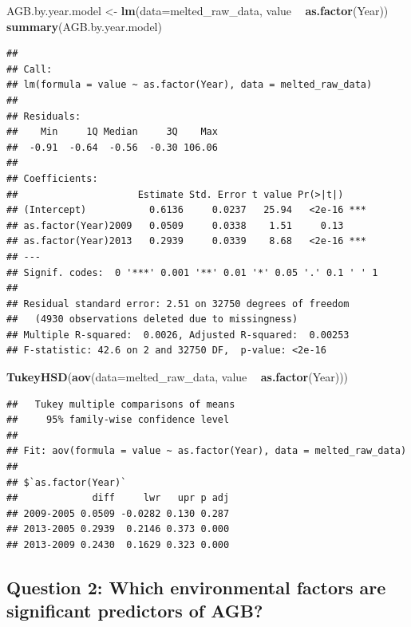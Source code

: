 \documentclass[12pt,]{article}
\newenvironment{Shaded}{\begin{snugshade}}{\end{snugshade}}
\newcommand{\DataTypeTok}[1]{\textcolor[rgb]{0.13,0.29,0.53}{#1}}
\newcommand{\KeywordTok}[1]{\textcolor[rgb]{0.13,0.29,0.53}{\textbf{#1}}}
\newcommand{\NormalTok}[1]{#1}
\newcommand{\OperatorTok}[1]{\textcolor[rgb]{0.81,0.36,0.00}{\textbf{#1}}}
\newcommand{\StringTok}[1]{\textcolor[rgb]{0.31,0.60,0.02}{#1}}
\begin{document}
\begin{Shaded}
\begin{Highlighting}[]
\NormalTok{AGB.by.year.model <-}\StringTok{ }\KeywordTok{lm}\NormalTok{(}\DataTypeTok{data=}\NormalTok{melted_raw_data, value }\OperatorTok{~}\StringTok{ }\KeywordTok{as.factor}\NormalTok{(Year))}
\KeywordTok{summary}\NormalTok{(AGB.by.year.model)}
\end{Highlighting}
\end{Shaded}

\begin{verbatim}
## 
## Call:
## lm(formula = value ~ as.factor(Year), data = melted_raw_data)
## 
## Residuals:
##    Min     1Q Median     3Q    Max 
##  -0.91  -0.64  -0.56  -0.30 106.06 
## 
## Coefficients:
##                     Estimate Std. Error t value Pr(>|t|)    
## (Intercept)           0.6136     0.0237   25.94   <2e-16 ***
## as.factor(Year)2009   0.0509     0.0338    1.51     0.13    
## as.factor(Year)2013   0.2939     0.0339    8.68   <2e-16 ***
## ---
## Signif. codes:  0 '***' 0.001 '**' 0.01 '*' 0.05 '.' 0.1 ' ' 1
## 
## Residual standard error: 2.51 on 32750 degrees of freedom
##   (4930 observations deleted due to missingness)
## Multiple R-squared:  0.0026, Adjusted R-squared:  0.00253 
## F-statistic: 42.6 on 2 and 32750 DF,  p-value: <2e-16
\end{verbatim}

\begin{Shaded}
\begin{Highlighting}[]
\KeywordTok{TukeyHSD}\NormalTok{(}\KeywordTok{aov}\NormalTok{(}\DataTypeTok{data=}\NormalTok{melted_raw_data, value }\OperatorTok{~}\StringTok{ }\KeywordTok{as.factor}\NormalTok{(Year)))}
\end{Highlighting}
\end{Shaded}

\begin{verbatim}
##   Tukey multiple comparisons of means
##     95% family-wise confidence level
## 
## Fit: aov(formula = value ~ as.factor(Year), data = melted_raw_data)
## 
## $`as.factor(Year)`
##             diff     lwr   upr p adj
## 2009-2005 0.0509 -0.0282 0.130 0.287
## 2013-2005 0.2939  0.2146 0.373 0.000
## 2013-2009 0.2430  0.1629 0.323 0.000
\end{verbatim}

\hypertarget{question-2-which-environmental-factors-are-significant-predictors-of-agb}{%
\subsection{Question 2: Which environmental factors are significant
predictors of
AGB?}\label{question-2-which-environmental-factors-are-significant-predictors-of-agb}}
\end{document}
